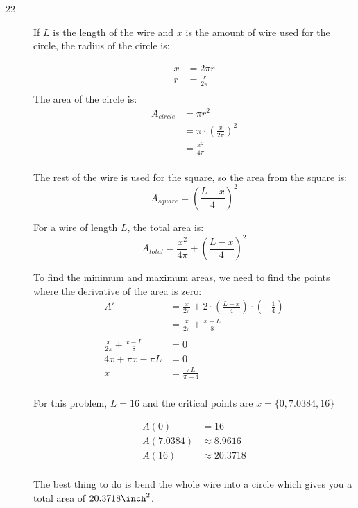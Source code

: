 \documentclass[fleqn]{exam}
\begin{document}
\begin{description}

\item[22]
If $L$ is the length of the wire and $x$ is the amount of wire used for the circle, the radius of the circle is:

\begin{align*}
  x &= 2 \pi r \\
  r &= \frac{x}{2 \pi} \\
\end{align*}
The area of the circle is:
\begin{align*}
  A_{circle} &= \pi r^2 \\
    &= \pi \cdot \left( \frac{x}{2 \pi} \right)^2 \\
    &= \frac{x^2}{4 \pi} \\
\end{align*}

The rest of the wire is used for the square, so the area from the square is: 
\[
  A_{square} = \left( \frac{L - x}{4} \right)^2
\]

For a wire of length $L$, the total area is:
\[
  A_{total} = \frac{x^2}{4 \pi} + \left( \frac{L - x}{4} \right)^2
\]

To find the minimum and maximum areas, we need to find the points where the derivative of the area is zero:
\begin{align*}
  A' &= \frac{x}{2 \pi} + 2 \cdot \left( \frac{L - x}{4} \right) \cdot \left( -\frac{1}{4} \right) \\
     &= \frac{x}{2 \pi} + \frac{x - L}{8} \\
\\
  \frac{x}{2 \pi} + \frac{x - L}{8} &= 0 \\
  4x + \pi x - \pi L &= 0 \\
  x &= \frac{\pi L}{\pi + 4} \\
\end{align*}

For this problem, $L = 16$ and the critical points are $x = \{0, 7.0384, 16\}$

\begin{align*}
  A(0) &= 16 \\
  A(7.0384) &\approx 8.9616 \\
  A(16) &\approx 20.3718 \\ 
\end{align*}

The best thing to do is bend the whole wire into a circle which gives you a total area of $20.3718 \inch^2$.  


\end{description}
\end{document}
